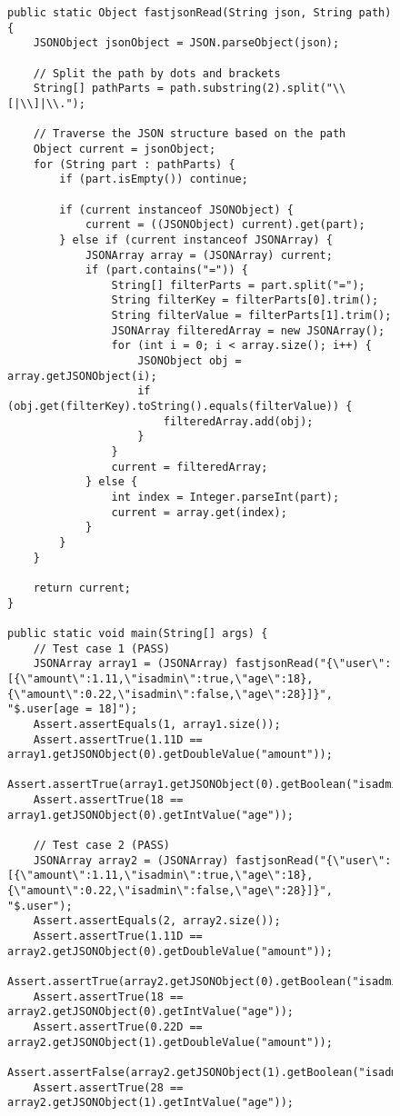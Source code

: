 \begin{figure}
\centering
    \begin{lstlisting}[style = Java-github]
public static Object fastjsonRead(String json, String path) {
    JSONObject jsonObject = JSON.parseObject(json);
        
    // Split the path by dots and brackets
    String[] pathParts = path.substring(2).split("\\[|\\]|\\.");

    // Traverse the JSON structure based on the path
    Object current = jsonObject;
    for (String part : pathParts) {
        if (part.isEmpty()) continue;
            
        if (current instanceof JSONObject) {
            current = ((JSONObject) current).get(part);
        } else if (current instanceof JSONArray) {
            JSONArray array = (JSONArray) current;
            if (part.contains("=")) {
                String[] filterParts = part.split("=");
                String filterKey = filterParts[0].trim();
                String filterValue = filterParts[1].trim();
                JSONArray filteredArray = new JSONArray();
                for (int i = 0; i < array.size(); i++) {
                    JSONObject obj = array.getJSONObject(i);
                    if (obj.get(filterKey).toString().equals(filterValue)) {
                        filteredArray.add(obj);
                    }
                }
                current = filteredArray;
            } else {
                int index = Integer.parseInt(part);
                current = array.get(index);
            }
        }
    }
        
    return current;
}

public static void main(String[] args) {
    // Test case 1 (PASS)
    JSONArray array1 = (JSONArray) fastjsonRead("{\"user\":[{\"amount\":1.11,\"isadmin\":true,\"age\":18},{\"amount\":0.22,\"isadmin\":false,\"age\":28}]}", "$.user[age = 18]");
    Assert.assertEquals(1, array1.size());
    Assert.assertTrue(1.11D == array1.getJSONObject(0).getDoubleValue("amount"));
    Assert.assertTrue(array1.getJSONObject(0).getBoolean("isadmin"));
    Assert.assertTrue(18 == array1.getJSONObject(0).getIntValue("age"));

    // Test case 2 (PASS)
    JSONArray array2 = (JSONArray) fastjsonRead("{\"user\":[{\"amount\":1.11,\"isadmin\":true,\"age\":18},{\"amount\":0.22,\"isadmin\":false,\"age\":28}]}", "$.user");
    Assert.assertEquals(2, array2.size());
    Assert.assertTrue(1.11D == array2.getJSONObject(0).getDoubleValue("amount"));
    Assert.assertTrue(array2.getJSONObject(0).getBoolean("isadmin"));
    Assert.assertTrue(18 == array2.getJSONObject(0).getIntValue("age"));
    Assert.assertTrue(0.22D == array2.getJSONObject(1).getDoubleValue("amount"));
    Assert.assertFalse(array2.getJSONObject(1).getBoolean("isadmin"));
    Assert.assertTrue(28 == array2.getJSONObject(1).getIntValue("age"));


\end{lstlisting}
\end{figure}
